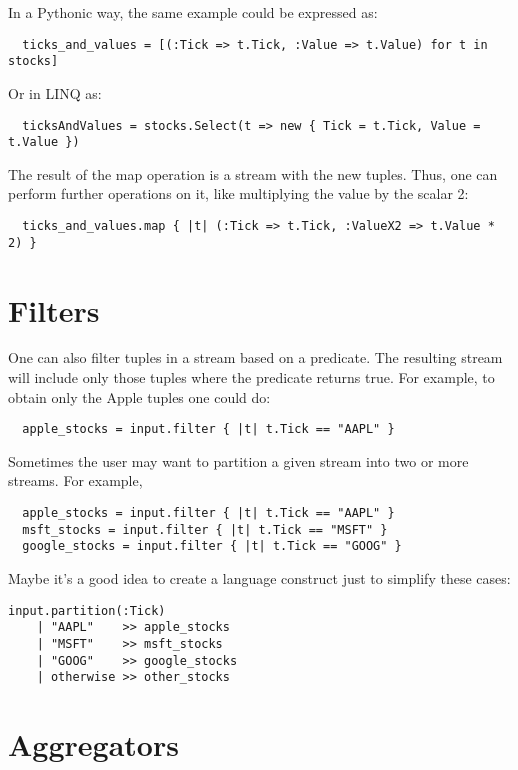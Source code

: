 \documentclass[twoside]{report}
\begin{document}
In a Pythonic way, the same example could be expressed as:

\begin{verbatim}
  ticks_and_values = [(:Tick => t.Tick, :Value => t.Value) for t in stocks]
\end{verbatim}

Or in LINQ as:

\begin{verbatim}
  ticksAndValues = stocks.Select(t => new { Tick = t.Tick, Value = t.Value })
\end{verbatim}

The result of the map operation is a stream with the new tuples. Thus, one can perform further operations on it, like multiplying the value by the scalar 2:

\begin{verbatim}
  ticks_and_values.map { |t| (:Tick => t.Tick, :ValueX2 => t.Value * 2) }
\end{verbatim}

\section{Filters}

One can also filter tuples in a stream based on a predicate. The resulting stream will include only those tuples where the predicate returns true. For example, to obtain only the Apple tuples one could do:

\begin{verbatim}
  apple_stocks = input.filter { |t| t.Tick == "AAPL" }
\end{verbatim}

Sometimes the user may want to partition a given stream into two or more streams. For example,

\begin{verbatim}
  apple_stocks = input.filter { |t| t.Tick == "AAPL" }
  msft_stocks = input.filter { |t| t.Tick == "MSFT" }
  google_stocks = input.filter { |t| t.Tick == "GOOG" }
\end{verbatim}

Maybe it's a good idea to create a language construct just to simplify these cases:

\begin{verbatim}
input.partition(:Tick)
    | "AAPL"    >> apple_stocks
    | "MSFT"    >> msft_stocks
    | "GOOG"    >> google_stocks
    | otherwise >> other_stocks
\end{verbatim}


\section{Aggregators}
\end{document}
